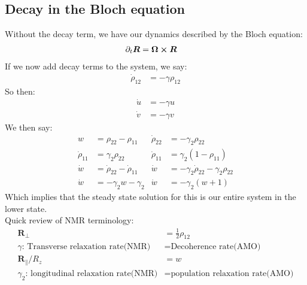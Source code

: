 \subsection{Decay in the Bloch equation}
Without the decay term, we have our dynamics described by the Bloch equation:
\begin{align*}
	\partial_t \bm{R} &= \bm{\Omega} \cross \bm{R}
\end{align*}
If we now add decay terms to the system, we say:
\begin{align*}
	\dot{\rho}_{12} &= -\gamma\rho_{12}
\end{align*}
So then:
\begin{align*}
	\dot{u} &= -\gamma u \\
	\dot{v} &= -\gamma v
\end{align*}
We then say:
\begin{align*}
	w &= \rho_{22} -\rho_{11} &
	\dot{\rho}_{22} &= -\gamma_2\rho_{22} \\
	\dot{\rho}_{11} &= \gamma_2\rho_{22} &
	\dot{\rho}_{11} &= \gamma_2(1-\rho_{11}) \\
	\dot{w} &= \dot{\rho}_22 - \dot{\rho}_{11} &
	\dot{w} &= -\gamma_2\dot{\rho}_22 - \gamma_2\rho_{22} \\
	\dot{w} &= -\gamma_2 w - \gamma_2 &
	\dot{w} &= -\gamma_2 (w +1)
\end{align*}
Which implies that the steady state solution for this is our entire system in the lower state. \\
Quick review of NMR terminology:
\begin{align*}
	\bm{R}_\perp &= \frac{1}{2}\rho_{12} \\
	\gamma\text{: Transverse relaxation rate(NMR)} &= \text{Decoherence rate(AMO)} \\
	\bm{R}_\parallel/R_z &= w \\
	\gamma_2\text{: longitudinal relaxation rate(NMR)} &= \text{population relaxation rate(AMO)}
\end{align*}

